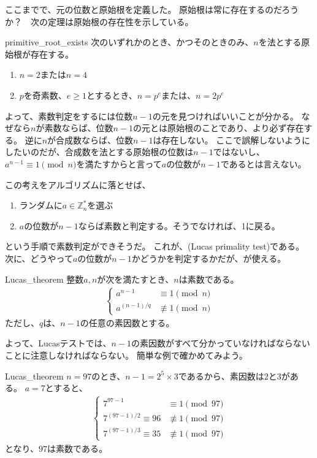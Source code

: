ここまでで、元の位数と原始根を定義した。
原始根は常に存在するのだろうか？　次の定理は原始根の存在性を示している。

\begin{Prop}{}{primitive_root_exists}
次のいずれかのとき、かつそのときのみ、$n$を法とする原始根が存在する。
\begin{enumerate}
 \item $n=2$または$n=4$
 \item $p$を奇素数、$e\ge1$とするとき、$n=p^e$または、$n=2p^e$
\end{enumerate}
\end{Prop}

よって、素数判定をするには位数$n-1$の元を見つければいいことが分かる。
なぜなら$n$が素数ならば、位数$n-1$の元とは原始根のことであり、より必ず存在する。
逆に$n$が合成数ならば、位数$n-1$は存在しない。
ここで誤解しないようにしたいのだが、合成数を法とする原始根の位数は$n-1$ではないし、$a^{n-1}\equiv1\pmod{n}$を満たすからと言って$a$の位数が$n-1$であるとは言えない。

この考えをアルゴリズムに落とせば、
\begin{enumerate}
 \item ランダムに$a\in\mathbb{Z}_n^*$を選ぶ
 \item $a$の位数が$n-1$ならば素数と判定する。そうでなければ、1に戻る。
\end{enumerate}
という手順で素数判定ができそうだ。
これが、(Lucas primality test)である。
次に、どうやって$a$の位数が$n-1$かどうかを判定するかだが、が使える。

\begin{Theo}{}{Lucas_theorem}
整数$a,n$が次を満たすとき、$n$は素数である。
\begin{align*}
\begin{cases}
a^{n-1} &\equiv 1 \pmod{n}\\
a^{(n-1)/q} &\not\equiv 1 \pmod{n}
\end{cases}
\end{align*}
ただし、$q$は、$n-1$の任意の素因数とする。
\end{Theo}

よって、Lucasテストでは、$n-1$の素因数がすべて分かっていなければならないことに注意しなければならない。
簡単な例で確かめてみよう。

\begin{Exam}{}{Lucas_theorem}
$n=97$のとき、$n-1=2^5\times3$であるから、素因数は$2$と$3$がある。
$a=7$とすると、
\begin{align*}
\begin{cases}
7^{97-1} &\equiv 1 \pmod{97}\\
7^{(97-1)/2}  \equiv 96 &\not\equiv 1 \pmod{97}\\
7^{(97-1)/3}  \equiv 35 &\not\equiv 1 \pmod{97}
\end{cases}
\end{align*}
となり、$97$は素数である。
\end{Exam}

